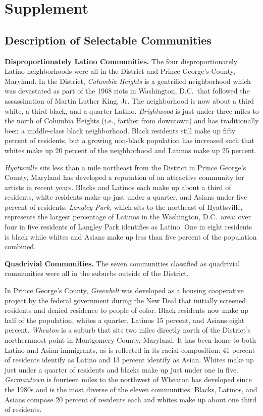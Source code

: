 \documentclass[11pt]{baderart}
\begin{document}
\clearpage
\section{Supplement}
\subsection{Description of Selectable Communities}
\textbf{Disproportionately Latino Communities.} The four disproportionately Latino neighborhoods were all in the District and Prince George's County, Maryland. In the District,  \emph{Columbia Heights} is a gentrified neighborhood which was devastated as part of the 1968 riots in Washington, D.C.\ that followed the assassination of Martin Luther King, Jr. The neighborhood is now about a third white, a third black, and a quarter Latino. \emph{Brightwood} is just under three miles to the north of Columbia Heights (i.e., farther from downtown) and has traditionally been a middle-class black neighborhood. Black residents still make up fifty percent of residents, but a growing non-black population has increased such that whites make up 20 percent of the neighborhood and Latinos make up 25 percent. 

\emph{Hyattsville} sits less than a mile northeast from the District in Prince George's County, Maryland has developed a reputation of an attractive community for artists in recent years. Blacks and Latinos each make up about a third of residents, white residents make up just under a quarter, and Asians under five percent of residents. \emph{Langley Park}, which sits to the northeast of Hyattsville, represents the largest percentage of Latinos in the Washington, D.C.\ area: over four in five residents of Langley Park identifies as Latino. One in eight residents is black while whites and Asians make up less than five percent of the population combined. 

\textbf{Quadrivial Communities.} The seven communities classified as quadrivial communities were all in the suburbs outside of the District. 

In Prince George's County, \emph{Greenbelt} was developed as a housing cooperative project by the federal government during the New Deal that initially screened residents and denied residence to people of color. Black residents now make up half of the population, whites a quarter, Latinos 15 percent, and Asians eight percent. \emph{Wheaton} is a suburb that sits two miles directly north of the District's northernmost point in Montgomery County, Maryland. It has been home to both Latino and Asian immigrants, as is reflected in its racial composition: 41 percent of residents identify as Latino and 13 percent identify as Asian. Whites make up just under a quarter of residents and blacks make up just under one in five. \emph{Germantown} is fourteen miles to the northwest of Wheaton has developed since the 1980s and is the most diverse of the eleven communities. Blacks, Latinos, and Asians compose 20 percent of residents each and whites make up about one third of residents. 
\end{document}
